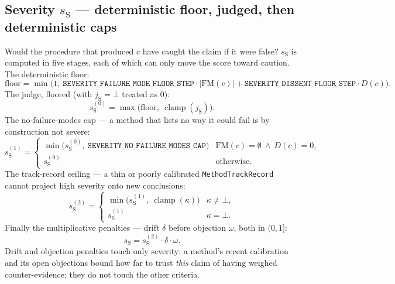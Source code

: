 \documentclass[11pt]{article}
\newcommand{\sS}{s_{\mathrm{S}}}
\newcommand{\code}[1]{\texttt{#1}}
\newcommand{\clip}{\operatorname{clamp}}
\begin{document}
\subsection{Severity $\sS$ --- deterministic floor, judged, then deterministic caps}

Would the procedure that produced $c$ have caught the claim if it were false?
$\sS$ is computed in five stages, each of which can only move the score toward
caution. The deterministic floor:
\begin{equation}
\label{eq:sev-floor}
\mathrm{floor} = \min\!\bigl(1,\ \texttt{SEVERITY\_FAILURE\_MODE\_FLOOR\_STEP}\cdot|\mathrm{FM}(c)|
 + \texttt{SEVERITY\_DISSENT\_FLOOR\_STEP}\cdot D(c)\bigr).
\end{equation}
The judge, floored (with $j_{\mathrm{S}} = \bot$ treated as $0$):
\begin{equation}
\label{eq:sev-judge}
\sS^{(0)} = \max\!\bigl(\mathrm{floor},\ \clip(j_{\mathrm{S}})\bigr).
\end{equation}
The no-failure-modes cap --- a method that lists no way it could fail is by
construction not severe:
\begin{equation}
\label{eq:sev-cap}
\sS^{(1)} =
\begin{cases}
\min\!\bigl(\sS^{(0)},\ \texttt{SEVERITY\_NO\_FAILURE\_MODES\_CAP}\bigr)
  & \mathrm{FM}(c)=\emptyset \ \wedge\ D(c)=0,\\[2pt]
\sS^{(0)} & \text{otherwise}.
\end{cases}
\end{equation}
The track-record ceiling --- a thin or poorly calibrated
\code{MethodTrackRecord} cannot project high severity onto new conclusions:
\begin{equation}
\label{eq:sev-ceiling}
\sS^{(2)} =
\begin{cases}
\min\!\bigl(\sS^{(1)},\ \clip(\kappa)\bigr) & \kappa \ne \bot,\\[2pt]
\sS^{(1)} & \kappa = \bot.
\end{cases}
\end{equation}
Finally the multiplicative penalties --- drift $\delta$ before objection
$\omega$, both in $(0,1]$:
\begin{equation}
\label{eq:sev-final}
\sS = \sS^{(2)} \cdot \delta \cdot \omega.
\end{equation}
Drift and objection penalties touch only severity: a method's recent
calibration and its open objections bound how far to trust \emph{this} claim
of having weighed counter-evidence; they do not touch the other criteria.
\end{document}
